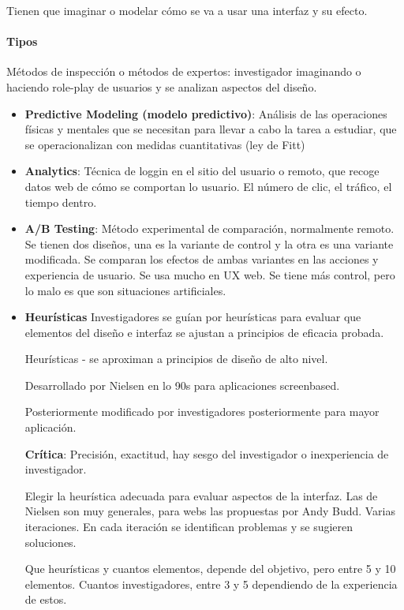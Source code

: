 \documentclass[12pt]{report} %
\begin{document}
Tienen que imaginar o modelar cómo se va a usar una interfaz y su efecto.

\paragraph{Tipos}        
Métodos de inspección o métodos de expertos: investigador imaginando o haciendo role-play de usuarios y se analizan aspectos del diseño.

\begin{itemize}
  \item \textbf{Predictive Modeling (modelo predictivo)}: Análisis de las operaciones físicas y mentales que se necesitan para llevar a cabo la tarea a estudiar, que se operacionalizan con medidas cuantitativas (ley de Fitt)
  \item \textbf{Analytics}: Técnica de loggin en el sitio del usuario o remoto, que recoge datos web de cómo se comportan lo usuario. El número de clic, el tráfico, el tiempo dentro.
  \item \textbf{A/B Testing}: Método experimental de comparación, normalmente remoto. Se tienen dos diseños, una es la variante de control y la otra es una variante modificada. Se comparan los efectos de ambas variantes en las acciones y experiencia de usuario. Se usa mucho en UX web. Se tiene más control, pero lo malo es que son situaciones artificiales.
  \item \textbf{Heurísticas}
  Investigadores se guían por heurísticas para evaluar que elementos del diseño e interfaz se ajustan a principios de eficacia probada.
  
  Heurísticas - se aproximan a principios de diseño de alto nivel.
  
  Desarrollado por Nielsen en lo 90s para aplicaciones screenbased.
  
  Posteriormente modificado por investigadores posteriormente para mayor aplicación.
  
  \textbf{Crítica}: Precisión, exactitud, hay sesgo del investigador o inexperiencia de investigador.
  
  Elegir la heurística adecuada para evaluar aspectos de la interfaz. Las de Nielsen son muy generales, para webs las propuestas por Andy Budd. Varias iteraciones. En cada iteración se identifican problemas y se sugieren soluciones.
  
Que heurísticas y cuantos elementos, depende del objetivo, pero entre 5 y 10 elementos. Cuantos investigadores, entre 3 y 5 dependiendo de la experiencia de estos.


\end{itemize}
\end{document}
